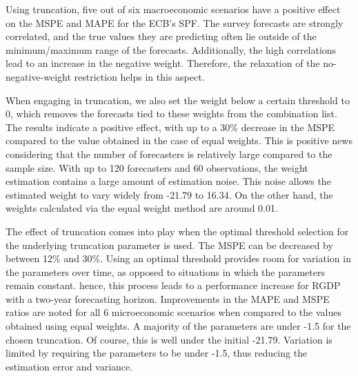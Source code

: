 \documentclass[11pt]{article}
\begin{document}
	Using truncation, five out of six macroeconomic scenarios have a positive effect on the MSPE and MAPE for the ECB's SPF. The survey forecasts are strongly correlated, and the true values they are predicting often lie outside of the minimum/maximum range of the forecasts. Additionally, the high correlations lead to an increase in the negative weight. Therefore, the relaxation of the no-negative-weight restriction helps in this aspect.
	
	When engaging in truncation, we also set the weight below a certain threshold to 0, which removes the forecasts tied to these weights from the combination list. The results indicate a positive effect, with up to a 30\% decrease in the MSPE compared to the value obtained in the case of equal weights. This is positive news considering that the number of forecasters is relatively large compared to the sample size. With up to 120 forecasters and 60 observations, the weight estimation contains a large amount of estimation noise. This noise allows the estimated weight to vary widely from -21.79 to 16.34. On the other hand, the weights calculated via the equal weight method are around 0.01.
	
	The effect of truncation comes into play when the optimal threshold selection for the underlying truncation parameter is used. The MSPE can be decreased by between 12\% and 30\%. Using an optimal threshold provides room for variation in the parameters over time, as opposed to situations in which the parameters remain constant. hence, this process leads to a performance increase for RGDP with a two-year forecasting horizon. Improvements in the MAPE and MSPE ratios are noted for all 6 microeconomic scenarios when compared to the values obtained using equal weights. A majority of the parameters are under -1.5 for the chosen truncation. Of course, this is well under the initial -21.79. Variation is limited by requiring the parameters to be under -1.5, thus reducing the estimation error and variance. 
	
\end{document}
